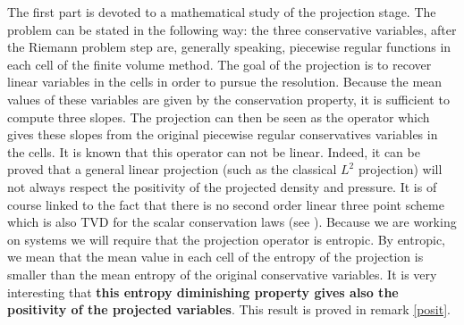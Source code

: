 \documentclass{fldauth}
\theoremstyle{plain}
\theoremstyle{plain}
\theoremstyle{plain}
\theoremstyle{plain}
\theoremstyle{plain}
\theoremstyle{plain}
\begin{document}
The first part is devoted to a mathematical study of the
projection stage. The problem can be stated in the following way:
the three conservative variables, after the Riemann problem step
are, generally speaking, piecewise regular functions in each cell
of the finite volume method. The goal of the projection is to
recover linear variables in the cells in order to pursue the
resolution. Because the mean values of these variables are given
by the conservation property, it is sufficient to compute three
slopes. The projection can then be seen as the operator which
gives these slopes from the original piecewise regular
conservatives variables in the cells. It is known that this
operator can not be linear. Indeed, it can be proved that a
general linear projection (such as the classical $L^2$ projection)
will not always respect the positivity of the projected density
and pressure. It is of course linked to the fact that there is no
second order linear three point scheme which is also TVD for the
scalar conservation laws (see \cite{raviart}). Because we are
working on systems we will require that the projection operator is
entropic. By entropic, we mean that the mean value in each cell of
the entropy of the projection is smaller than the mean entropy of
the original conservative variables. It is very interesting that
\textbf{this entropy diminishing property gives also the
positivity of the projected variables}. This result is proved in
remark \ref{posit}.
\end{document}
